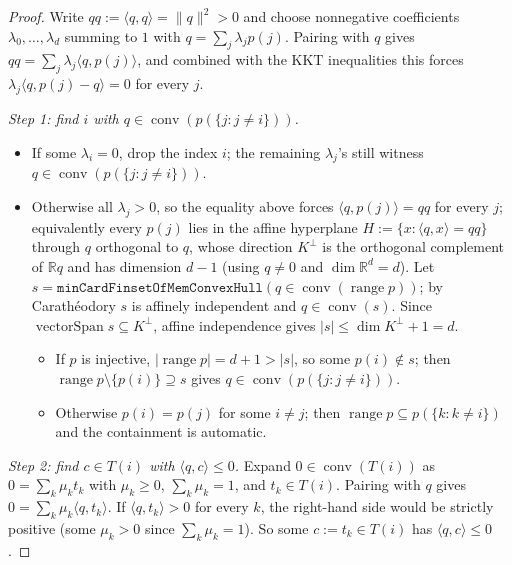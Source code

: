\begin{proof}
\leanok
Write \(qq := \langle q, q \rangle = \|q\|^{2} > 0\) and choose
nonnegative coefficients \(\lambda_0, \dots, \lambda_d\) summing to
\(1\) with \(q = \sum_j \lambda_j p(j)\). Pairing with \(q\) gives
\(qq = \sum_j \lambda_j \langle q, p(j) \rangle\), and combined with
the KKT inequalities this forces
\(\lambda_j \langle q, p(j) - q \rangle = 0\) for every \(j\).

\smallskip
\emph{Step 1: find \(i\) with
\(q \in \operatorname{conv}(p(\{j : j \neq i\}))\).}
\begin{itemize}
\item If some \(\lambda_i = 0\), drop the index \(i\); the remaining
\(\lambda_j\)'s still witness
\(q \in \operatorname{conv}(p(\{j : j \neq i\}))\).
\item Otherwise all \(\lambda_j > 0\), so the equality above forces
\(\langle q, p(j) \rangle = qq\) for every \(j\); equivalently every
\(p(j)\) lies in the affine hyperplane \(H := \{x : \langle q, x \rangle = qq\}\)
through \(q\) orthogonal to \(q\), whose direction
\(K^{\perp}\) is the orthogonal complement of \(\mathbb{R} q\) and has
dimension \(d - 1\) (using \(q \neq 0\) and
\(\dim \mathbb{R}^d = d\)). Let
\(s = \texttt{minCardFinsetOfMemConvexHull}(q \in \operatorname{conv}
(\operatorname{range} p))\); by Carathéodory \(s\) is affinely
independent and \(q \in \operatorname{conv}(s)\). Since
\(\operatorname{vectorSpan} s \subseteq K^{\perp}\), affine
independence gives \(|s| \le \dim K^{\perp} + 1 = d\).
  \begin{itemize}
  \item If \(p\) is injective, \(|\operatorname{range} p| = d + 1 > |s|\),
  so some \(p(i) \notin s\); then
  \(\operatorname{range} p \setminus \{p(i)\} \supseteq s\) gives
  \(q \in \operatorname{conv}(p(\{j : j \neq i\}))\).
  \item Otherwise \(p(i) = p(j)\) for some \(i \neq j\); then
  \(\operatorname{range} p \subseteq p(\{k : k \neq i\})\) and the
  containment is automatic.
  \end{itemize}
\end{itemize}

\smallskip
\emph{Step 2: find \(c \in T(i)\) with \(\langle q, c \rangle \le 0\).}
Expand \(0 \in \operatorname{conv}(T(i))\) as
\(0 = \sum_k \mu_k t_k\) with \(\mu_k \ge 0\), \(\sum_k \mu_k = 1\),
and \(t_k \in T(i)\). Pairing with \(q\) gives
\(0 = \sum_k \mu_k \langle q, t_k \rangle\). If
\(\langle q, t_k \rangle > 0\) for every \(k\), the right-hand side
would be strictly positive (some \(\mu_k > 0\) since
\(\sum_k \mu_k = 1\)). So some \(c := t_k \in T(i)\) has
\(\langle q, c \rangle \le 0\).


\end{proof}
